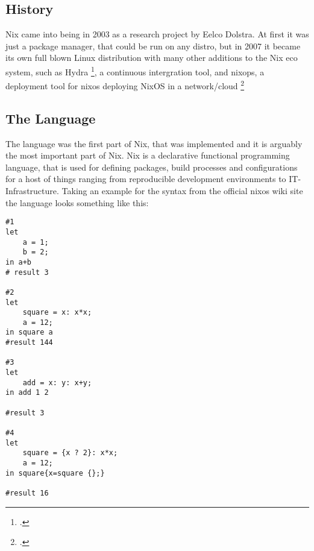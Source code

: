 \subsection{History}
Nix came into being in 2003 as a research project by Eelco Dolstra. At first it was just a package manager, that could be run on any distro, but in 2007 it became its 
own full blown Linux distribution with many other additions to the Nix eco system, such as Hydra \footcite{hydra}, a continuous intergration tool, and nixops, 
a deployment tool for nixos deploying NixOS in a network/cloud \footcite{NixOps}

\subsection{The Language}
The language was the first part of Nix, that was implemented and it is arguably the most important part of Nix. Nix is a declarative functional programming language,
that is used for defining packages, build processes and configurations for a host of things ranging from reproducible development environments to IT-Infrastructure.
Taking an example for the syntax from the official nixos wiki site the language looks something like this: 

\begin{minipage}{\textwidth}

\begin{verbatim}
#1
let
    a = 1;
    b = 2;
in a+b
# result 3

#2
let
    square = x: x*x;
    a = 12;
in square a
#result 144

#3
let 
    add = x: y: x+y;
in add 1 2

#result 3

#4
let
    square = {x ? 2}: x*x;
    a = 12;
in square{x=square {};}

#result 16
\end{verbatim}
\end{minipage}


